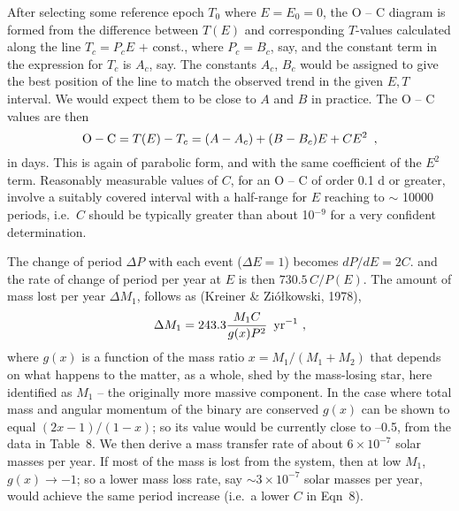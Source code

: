 \documentclass[useAMS,usenatbib]{mnras}                                                                           \usepackage[pdftex]{graphicx}
\begin{document}
{After selecting some reference epoch  $T_0$
where   $E = E_0 = 0$, the O -- C diagram  is formed
from the difference between $T(E)$ and 
corresponding $T$-values calculated along the line $T_c = P_c E$ $+$ {const.},
where $P_c = B_c$, say, and 
the constant term in the expression for $T_c$ is $A_c$, say.
The constants $A_c$, $B_c$ would be assigned to give the best position
of the line to match the observed trend in the given $E,T$ interval.  
We would expect them to be close to $A$ and $B$ in practice.  The O -- C values are then
\begin{equation}
{\rm O - C} = T(E) - T_c = (A - A_c) + (B - B_c)E + CE^2  \,\,\,  ,
\end{equation}
in days.
This is again of parabolic form, and with the same coefficient of the $E^2$ term.
Reasonably measurable values of $C$, for an O -- C of order 0.1 d or greater,
involve a suitably covered interval with a half-range for $E$ reaching to $\sim$ 10000 periods,
i.e.\ $C$ should be typically greater than about 10$^{-9}$ for a very confident 
determination.

The change of period $\Delta P$ with each event ($\Delta E = 1$) becomes $dP/dE = 2C$. 
and the rate of change of period per year at $E$ is then $730.5\, C/P(E)$.
 The amount of mass lost per year
$\Delta M_1$, follows as (Kreiner \& Zi\'{o}{\l}kowski, 1978),
\begin{equation}
\Delta{M_1} = 243.3 \frac{ M_1 C}{g(x)P^2} \,\,\,  {\rm yr}^{-1} \,\, ,
\end{equation}
where $g(x)$ is a function of the mass ratio $x  = M_1/(M_1 + M_2)$ that 
depends on what happens to the matter, as a whole,  shed by the mass-losing star,
here identified as $M_1$ -- the originally more massive component.
In the case where total mass and angular momentum of the binary are conserved 
$g(x)$ can be shown to equal $(2x -1)/(1 - x)$; so its value would be currently 
close to  --0.5, from the data in Table~8.   
 We then derive a mass transfer rate of about 
 $6\times 10^{-7}$ solar masses per year.  
 If most of the mass is lost from the system, then at low $M_1$, $g(x) \rightarrow -1$;
 so a lower mass loss rate, say $\sim 3\times 10^{-7}$ solar masses per year,
 would achieve the same period increase (i.e.\ a lower $C$ in Eqn~8).
 
}
\end{document}
